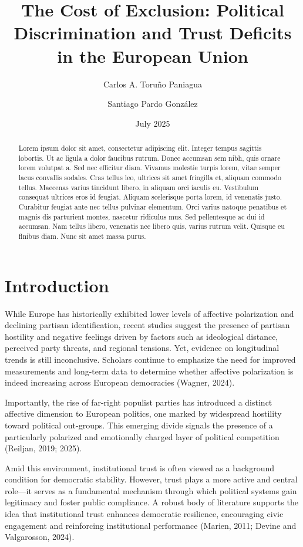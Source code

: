 \documentclass{article}
\title{The Cost of Exclusion: Political Discrimination and Trust Deficits in the European Union}
\author{Carlos A. Toruño Paniagua}
\author{Santiago Pardo González}
\affil{\emph{The World Justice Project}}
\date{July 2025}
\begin{document}
\maketitle

\begin{abstract}
Lorem ipsum dolor sit amet, consectetur adipiscing elit. Integer tempus sagittis lobortis. Ut ac ligula a dolor faucibus rutrum. Donec accumsan sem nibh, quis ornare lorem volutpat a. Sed nec efficitur diam. Vivamus molestie turpis lorem, vitae semper lacus convallis sodales. Cras tellus leo, ultrices sit amet fringilla et, aliquam commodo tellus. Maecenas varius tincidunt libero, in aliquam orci iaculis eu. Vestibulum consequat ultrices eros id feugiat. Aliquam scelerisque porta lorem, id venenatis justo. Curabitur feugiat ante nec tellus pulvinar elementum. Orci varius natoque penatibus et magnis dis parturient montes, nascetur ridiculus mus. Sed pellentesque ac dui id accumsan. Nam tellus libero, venenatis nec libero quis, varius rutrum velit. Quisque eu finibus diam. Nunc sit amet massa purus.
\end{abstract}

\section{Introduction}

While Europe has historically exhibited lower levels of affective polarization and declining partisan identification, recent studies suggest the presence of partisan hostility and negative feelings driven by factors such as ideological distance, perceived party threats, and regional tensions. Yet, evidence on longitudinal trends is still inconclusive. Scholars continue to emphasize the need for improved measurements and long-term data to determine whether affective polarization is indeed increasing across European democracies (Wagner, 2024).

Importantly, the rise of far-right populist parties has introduced a distinct affective dimension to European politics, one marked by widespread hostility toward political out-groups. This emerging divide signals the presence of a particularly polarized and emotionally charged layer of political competition (Reiljan, 2019; 2025).

Amid this environment, institutional trust is often viewed as a background condition for democratic stability. However, trust plays a more active and central role—it serves as a fundamental mechanism through which political systems gain legitimacy and foster public compliance. A robust body of literature supports the idea that institutional trust enhances democratic resilience, encouraging civic engagement and reinforcing institutional performance (Marien, 2011; Devine and Valgarosson, 2024).
\end{document}
